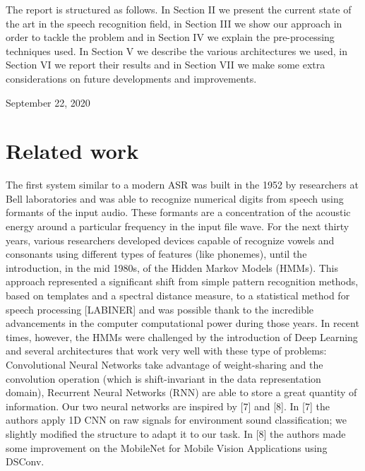 \documentclass[conference]{IEEEtran}
\begin{document}
The report is structured as follows. In Section II we present the current state of the art in the speech recognition field, in Section III we show our approach in order to tackle the problem and in Section IV we explain the pre-processing techniques used. In Section V we describe the various architectures we used, in Section VI we report their results and in Section VII we make some extra considerations on future developments and improvements.

\hfill September 22, 2020

\section{Related work}
The first system similar to a modern ASR was built in the 1952 by researchers at Bell laboratories and was able to recognize numerical digits from speech using formants of the input audio. These formants are a concentration of the acoustic energy around a particular frequency in the input file wave. 
For the next thirty years, various researchers developed devices capable of recognize vowels and consonants using different types of features (like phonemes), until the introduction, in the mid 1980s, of the Hidden Markov Models (HMMs). This approach represented a significant shift from simple pattern recognition methods, based on templates and a spectral distance measure, to a statistical method for speech processing [LABINER] and was possible thank to the incredible advancements in the computer computational power during those years.
In recent times, however, the HMMs were challenged by the introduction of Deep Learning and several architectures that work very well with these type of problems: Convolutional Neural Networks take advantage of weight-sharing and the convolution operation (which is shift-invariant in the data representation domain), Recurrent Neural Networks (RNN) are able to store a great quantity of information.
Our two neural networks are inspired by [7] and [8]. 
In [7] the authors apply 1D CNN on raw signals for environment sound classification; we slightly modified the structure to adapt it to our task. In [8] the authors made some improvement on the MobileNet for Mobile Vision Applications using DSConv. 
\end{document}
